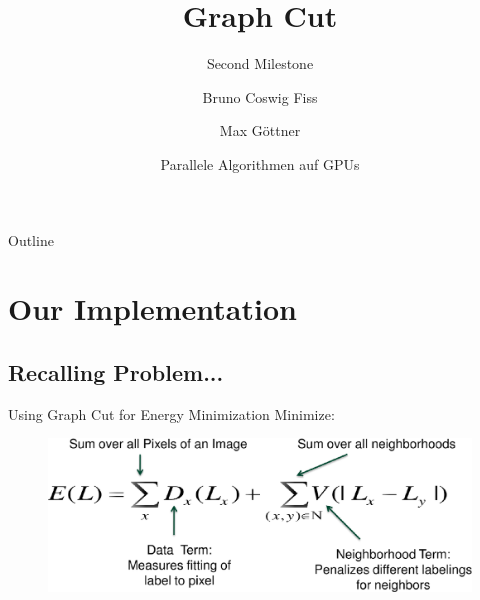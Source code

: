 \documentclass{beamer}
\title[Graph Cut - 2nd Milestone] %
{Graph Cut}
\subtitle
{Second Milestone}
\author[Bruno C. Fiss, Max Göttner] %
{Bruno Coswig Fiss \and Max Göttner}
\institute[TU Berlin] %
{
  \inst{1}%
  Institut für Technische Informatik und Mikroelektronik\\
  Technische Universität Berlin}
\date[\today] %
{Parallele Algorithmen auf GPUs}
\begin{document}
\begin{frame}
  \titlepage
\end{frame}

\begin{frame}{Outline}
  \tableofcontents
\end{frame}





\section{Our Implementation}

\subsection{Recalling Problem...}

\begin{frame}{Using Graph Cut for Energy Minimization}
   Minimize:
   \begin{figure}
   \includegraphics[scale=0.5]{formula} 
   \end{figure}
\end{frame}
\end{document}
